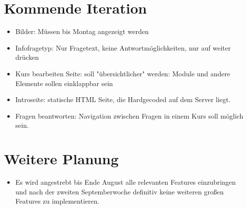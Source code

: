 \documentclass[colorback, accentcolor=tud1c, paper=a4]{tudexercise}
\begin{document}
\begin{multicols}{2}
\section*{Kommende Iteration}
\begin{itemize}
	\item Bilder: Müssen bis Montag angezeigt werden
	\item Infofragetyp: Nur Fragetext, keine Antwortmöglichkeiten, nur auf weiter drücken
	\item Kurs bearbeiten Seite: soll "übersichtlicher" werden: Module und andere Elemente sollen einklappbar sein
	\item Introseite: statische HTML Seite, die Hardgecoded auf dem Server liegt.
	\item Fragen beantworten: Navigation zwischen Fragen in einem Kurs soll möglich sein.

\end{itemize}

\section*{Weitere Planung}
\begin{itemize}
	\item Es wird angestrebt bis Ende August alle relevanten Features einzubringen und nach der zweiten Septemberwoche definitiv keine weiteren großen Features zu implementieren.
\end{itemize}

\end{multicols}
\end{document}
